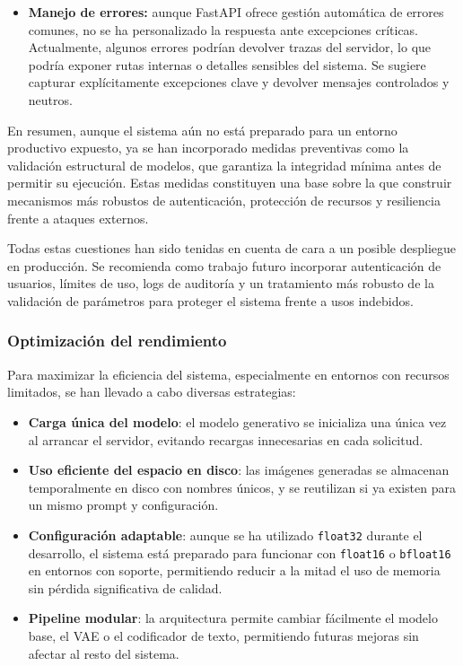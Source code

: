 \begin{itemize}
    \item \textbf{Manejo de errores:} aunque FastAPI ofrece gestión automática de errores comunes, no se ha personalizado la respuesta ante excepciones críticas. Actualmente, algunos errores podrían devolver trazas del servidor, lo que podría exponer rutas internas o detalles sensibles del sistema. Se sugiere capturar explícitamente excepciones clave y devolver mensajes controlados y neutros.
\end{itemize}

En resumen, aunque el sistema aún no está preparado para un entorno productivo expuesto, ya se han incorporado medidas preventivas como la validación estructural de modelos, que garantiza la integridad mínima antes de permitir su ejecución. Estas medidas constituyen una base sobre la que construir mecanismos más robustos de autenticación, protección de recursos y resiliencia frente a ataques externos.

Todas estas cuestiones han sido tenidas en cuenta de cara a un posible despliegue en producción. Se recomienda como trabajo futuro incorporar autenticación de usuarios, límites de uso, logs de auditoría y un tratamiento más robusto de la validación de parámetros para proteger el sistema frente a usos indebidos.

\subsubsection{Optimización del rendimiento}

Para maximizar la eficiencia del sistema, especialmente en entornos con recursos limitados, se han llevado a cabo diversas estrategias:

\begin{itemize}
    \item \textbf{Carga única del modelo}: el modelo generativo se inicializa una única vez al arrancar el servidor, evitando recargas innecesarias en cada solicitud.
    \item \textbf{Uso eficiente del espacio en disco}: las imágenes generadas se almacenan temporalmente en disco con nombres únicos, y se reutilizan si ya existen para un mismo prompt y configuración.
    \item \textbf{Configuración adaptable}: aunque se ha utilizado \texttt{float32} durante el desarrollo, el sistema está preparado para funcionar con \texttt{float16} o \texttt{bfloat16} en entornos con soporte, permitiendo reducir a la mitad el uso de memoria sin pérdida significativa de calidad.
    \item \textbf{Pipeline modular}: la arquitectura permite cambiar fácilmente el modelo base, el VAE o el codificador de texto, permitiendo futuras mejoras sin afectar al resto del sistema.
\end{itemize}

